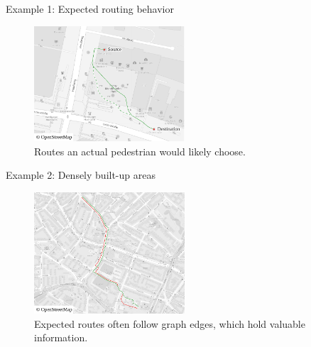 \documentclass{beamer}
\newenvironment{figcenter}
{%
	\parskip=0pt%
	\par%
	\nopagebreak%
	\centering%
}%
{%
	\par%
	\noindent%
	\ignorespacesafterend%
}
\begin{document}
		\begin{frame}{Example 1: Expected routing behavior}
			\begin{figure}[t]
				\begin{figcenter}
					\includegraphics[width=0.5\textwidth]{images/qgis-routing-osterstrasse_expected.pdf}
				\end{figcenter}
				\caption{Routes an actual pedestrian would likely choose.}
			\end{figure}
		\end{frame}
		
		\begin{frame}{Example 2: Densely built-up areas}
			\begin{figure}[t]
				\begin{figcenter}
					\includegraphics[width=0.5\textwidth]{images/qgis-routing-similar.pdf}
				\end{figcenter}
				\caption{Expected routes often follow graph edges, which hold valuable information.}
			\end{figure}
		\end{frame}
		
\end{document}
